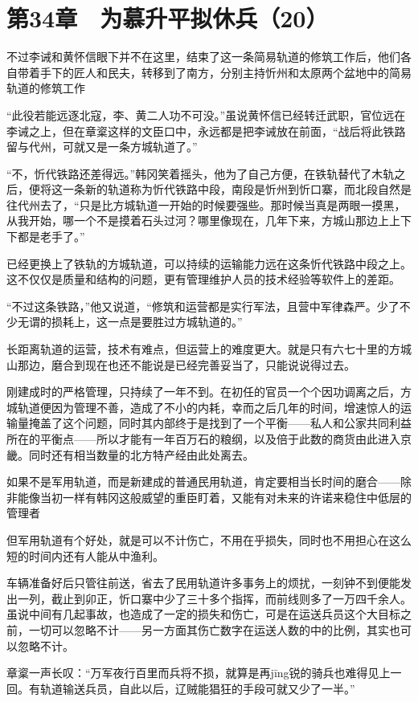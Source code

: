 \section{第34章　为慕升平拟休兵（20）}

不过李诫和黄怀信眼下并不在这里，结束了这一条简易轨道的修筑工作后，他们各自带着手下的匠人和民夫，转移到了南方，分别主持忻州和太原两个盆地中的简易轨道的修筑工作

“此役若能远逐北寇，李、黄二人功不可没。”虽说黄怀信已经转迁武职，官位远在李诫之上，但在章楶这样的文臣口中，永远都是把李诫放在前面，“战后将此铁路留与代州，可就又是一条方城轨道了。”

“不，忻代铁路还差得远。”韩冈笑着摇头，他为了自己方便，在铁轨替代了木轨之后，便将这一条新的轨道称为忻代铁路中段，南段是忻州到忻口寨，而北段自然是往代州去了，“只是比方城轨道一开始的时候要强些。那时候当真是两眼一摸黑，从我开始，哪一个不是摸着石头过河？哪里像现在，几年下来，方城山那边上上下下都是老手了。”

已经更换上了铁轨的方城轨道，可以持续的运输能力远在这条忻代铁路中段之上。这不仅仅是质量和结构的问题，更有管理维护人员的技术经验等软件上的差距。

“不过这条铁路，”他又说道，“修筑和运营都是实行军法，且营中军律森严。少了不少无谓的损耗上，这一点是要胜过方城轨道的。”

长距离轨道的运营，技术有难点，但运营上的难度更大。就是只有六七十里的方城山那边，磨合到现在也还不能说是已经完善妥当了，只能说说得过去。

刚建成时的严格管理，只持续了一年不到。在初任的官员一个个因功调离之后，方城轨道便因为管理不善，造成了不小的内耗，幸而之后几年的时间，增速惊人的运输量掩盖了这个问题，同时其内部终于是找到了一个平衡——私人和公家共同利益所在的平衡点——所以才能有一年百万石的粮纲，以及倍于此数的商货由此进入京畿。同时还有相当数量的北方特产经由此处离去。

如果不是军用轨道，而是新建成的普通民用轨道，肯定要相当长时间的磨合——除非能像当初一样有韩冈这般威望的重臣盯着，又能有对未来的许诺来稳住中低层的管理者

但军用轨道有个好处，就是可以不计伤亡，不用在乎损失，同时也不用担心在这么短的时间内还有人能从中渔利。

车辆准备好后只管往前送，省去了民用轨道许多事务上的烦扰，一刻钟不到便能发出一列，截止到卯正，忻口寨中少了三十多个指挥，而前线则多了一万四千余人。虽说中间有几起事故，也造成了一定的损失和伤亡，可是在运送兵员这个大目标之前，一切可以忽略不计——另一方面其伤亡数字在运送人数的中的比例，其实也可以忽略不计。

章楶一声长叹：“万军夜行百里而兵将不损，就算是再jīng锐的骑兵也难得见上一回。有轨道输送兵员，自此以后，辽贼能猖狂的手段可就又少了一半。”

